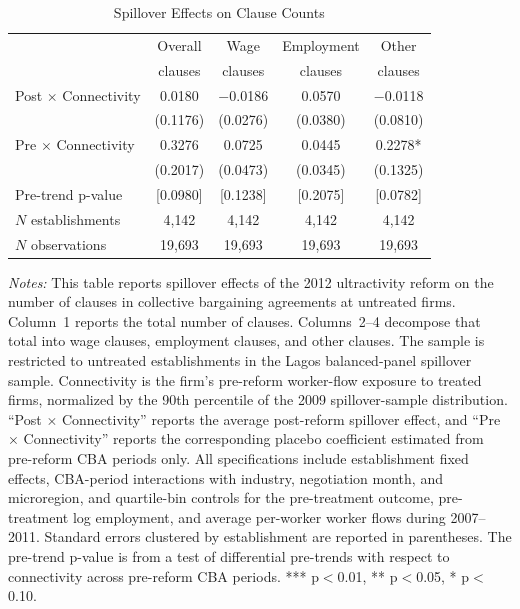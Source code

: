 \begin{table}[!htbp]
\centering
\caption{Spillover Effects on Clause Counts}
\label{tab:clause_count_spill}
\scriptsize
\begin{tabular}{lcccc}
\toprule
 & Overall & Wage & Employment & Other \\
 & clauses & clauses & clauses & clauses \\
\midrule
Post $\times$ Connectivity & 0.0180 & $-$0.0186 & 0.0570 & $-$0.0118\\
 & (0.1176) & (0.0276) & (0.0380) & (0.0810)\\
Pre $\times$ Connectivity & 0.3276 & 0.0725 & 0.0445 & 0.2278*\\
 & (0.2017) & (0.0473) & (0.0345) & (0.1325)\\
Pre-trend p-value & [0.0980] & [0.1238] & [0.2075] & [0.0782]\\
$N$ establishments & 4{,}142 & 4{,}142 & 4{,}142 & 4{,}142\\
$N$ observations & 19{,}693 & 19{,}693 & 19{,}693 & 19{,}693\\
\bottomrule
\end{tabular}
\begin{minipage}{\linewidth}
\footnotesize\vspace{4pt}
\textit{Notes:} This table reports spillover effects of the 2012 ultractivity reform on the number of clauses in collective bargaining agreements at untreated firms. Column~1 reports the total number of clauses. Columns~2--4 decompose that total into wage clauses, employment clauses, and other clauses. The sample is restricted to untreated establishments in the Lagos balanced-panel spillover sample. Connectivity is the firm's pre-reform worker-flow exposure to treated firms, normalized by the 90th percentile of the 2009 spillover-sample distribution. ``Post $\times$ Connectivity'' reports the average post-reform spillover effect, and ``Pre $\times$ Connectivity'' reports the corresponding placebo coefficient estimated from pre-reform CBA periods only. All specifications include establishment fixed effects, CBA-period interactions with industry, negotiation month, and microregion, and quartile-bin controls for the pre-treatment outcome, pre-treatment log employment, and average per-worker worker flows during 2007--2011. Standard errors clustered by establishment are reported in parentheses. The pre-trend p-value is from a test of differential pre-trends with respect to connectivity across pre-reform CBA periods. *** p$<$0.01, ** p$<$0.05, * p$<$0.10.
\end{minipage}
\end{table}
